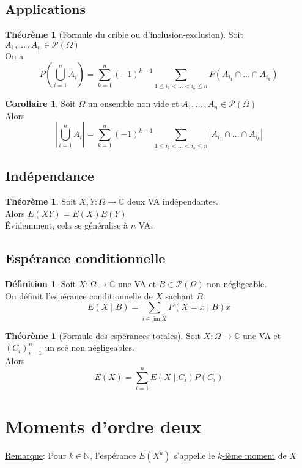 \documentclass[10pt,a4paper]{article}
\theoremstyle{definition}
\newtheorem{theorem}[proposition]{Théorème}
\newtheorem{corollaire}[proposition]{Corollaire}
\newtheorem{definition}[proposition]{Définition}
\DeclareMathOperator{\im}{im}
\begin{document}
\subsection{Applications}
\begin{theorem}[Formule du crible ou d'inclusion-exclusion]
Soit $A_1, ...\,, A_n \in \mathcal{P}(\Omega)$ \\
On a
\[ P\left(\bigcup_{i = 1}^n A_i \right) = \sum_{k = 1}^n (-1)^{k - 1} \sum_{1 \leq i_1 < ... < i_k \leq n} P\left(A_{i_1} \cap ... \cap A_{i_k}\right) \]
\end{theorem}
\begin{corollaire}
Soit $\Omega$ un ensemble non vide et $A_1, ...\,, A_n \in \mathcal{P}(\Omega)$ \\
Alors 
\[ \left| \bigcup_{i = 1}^n A_i \right| = \sum_{k = 1}^n (-1)^{k - 1} \sum_{1 \leq i_1 < ... < i_k \leq n} \left| A_{i_1} \cap ... \cap A_{i_k} \right| \]
\end{corollaire}

\subsection{Indépendance}
\begin{theorem}
Soit $X, Y: \Omega \to \mathbb{C}$ deux VA indépendantes. \\
Alors $E(XY) = E(X) E(Y)$ \\
Évidemment, cela se généralise à $n$ VA.
\end{theorem}

\subsection{Espérance conditionnelle}
\begin{definition}
Soit $X: \Omega \to \mathbb{C}$ une VA et $B \in \mathcal{P}(\Omega)$ non négligeable. \\
On définit l'espérance conditionnelle de $X$ sachant $B$:
\[ E(X \mid B) = \sum_{i \in \im X} P(X = x \mid B) x \]
\end{definition}
\begin{theorem}[Formule des espérances totales]
Soit $X: \Omega \to \mathbb{C}$ une VA et $(C_i)_{i = 1}^n$ un scé non négligeables. \\
Alors
\[ E(X) = \sum_{i = 1}^n E(X \mid C_i)P(C_i) \]
\end{theorem}

\section{Moments d'ordre deux}
\noindent \uline{Remarque}: Pour $k \in \mathbb{N}$, l'espérance $E(X^k)$ s'appelle le \uline{$k$-ième moment} de $X$
\end{document}
